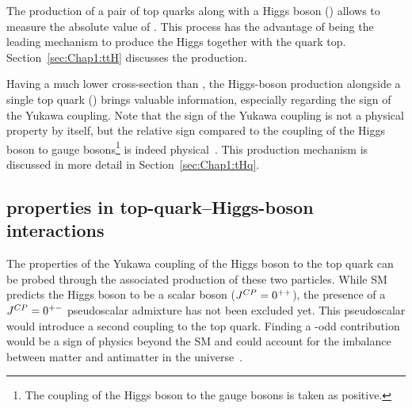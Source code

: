 
The production of a pair of top quarks along with a Higgs boson (\ttH) allows 
to measure the absolute value of \yt. This process has the advantage of 
being the leading mechanism to produce the Higgs together with the quark 
top. %
Section~\ref{sec:Chap1:ttH} discusses the \ttH production.

Having a much lower cross-section than \ttH, 
the Higgs-boson production alongside a single top quark (\tH) brings valuable information, especially
regarding the sign of the Yukawa coupling. Note that the sign of the Yukawa coupling is not a physical 
property by itself, but the relative sign compared to the coupling of the Higgs boson to 
gauge bosons\footnote{The coupling of the Higgs boson to the gauge bosons is taken as positive.} is indeed physical~\cite{Farina:2012xp}. 
This production mechanism is discussed in more detail in Section~\ref{sec:Chap1:tHq}. 







\subsection{\CP properties in top-quark--Higgs-boson interactions}
The \CP properties of the Yukawa coupling of the Higgs boson to the
top quark can be probed through the associated production of these 
two particles. While SM predicts the Higgs boson to be a scalar boson ($J^{CP}=0^{++}$),
the presence of a $J^{CP}=0^{+-}$ pseudoscalar admixture has not 
been excluded yet. This pseudoscalar would introduce a second coupling
to the top quark. Finding a \CP-odd contribution would be a sign of physics
beyond the SM and could account for the imbalance between matter and
antimatter in the universe~\cite{ATLAS:2020ior}. 

